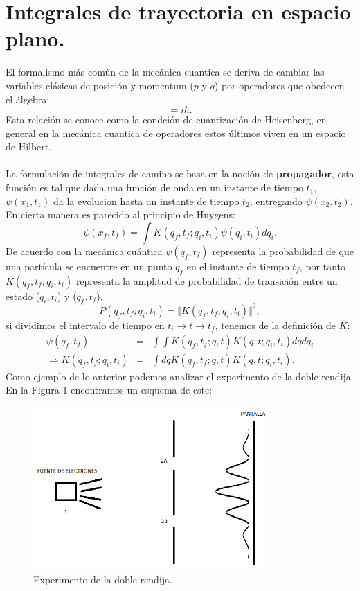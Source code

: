 \chapter{Integrales de trayectoria	 en espacio plano.}
El formalismo más común de la mecánica cuantica se deriva de cambiar las variables clásicas de posición y momentum ($p$ y $q$) por operadores que obedecen el álgebra:
\begin{equation}
[\hat{q},\hat{p}]=i\hbar.
\end{equation}
Esta relación se conoce como la condción de cuantización de Heisenberg, en general en la mecánica cuantica de operadores estos últimos viven en un espacio de Hilbert.
\\
\\
La formulación de integrales de camino se basa en la noción de \textbf{propagador}, esta función es tal que dada una función de onda en un instante de tiempo $t_1$, $\psi(x_1,t_1)$ da la evolucion hasta un instante de tiempo $t_2$, entregando $\psi(x_2,t_2)$. En cierta manera es parecido al principio de Huygens:
\begin{equation}
\psi(x_f,t_f)=\int K(q_f,t_f;q_i,t_i)\psi(q_i,t_i)dq_i.
\end{equation}
De acuerdo con la mecánica cuántica $\psi(q_f,t_f)$ representa la probabilidad de que una partícula se encuentre en un punto $q_f$ en el instante de tiempo $t_f$, por tanto $K(q_f,t_f;q_i,t_i)$ representa la amplitud de probabilidad de transición entre un estado ($q_i,t_i$) y ($q_f,t_f$).
\begin{equation}
P(q_f,t_f;q_i,t_i)=\Vert K(q_f,t_f;q_i,t_i) \Vert^2,
\end{equation}
si dividimos el intervalo de tiempo en $t_i\rightarrow t \rightarrow t_f$, tenemos de la definición de $K$:
\begin{eqnarray}
\nonumber \psi(q_f,t_f)&=&\int\int K(q_f,t_f;q,t)K(q,t;q_i,t_i)dqdq_i\\
\Rightarrow K(q_f,t_f;q_i,t_i)&=&\int dq K(q_f,t_f;q,t)K(q,t;q_i,t_i).
\end{eqnarray}
Como ejemplo de lo anterior podemos analizar el experimento de la doble rendija. En la Figura 1 encontramos un esquema de este:
\begin{figure}[h]
\centering
\includegraphics[width=9cm]{Imagenes/Fig1}
\caption[Esquema del experimento de la doble rendija]{Experimento de la doble rendija.}
\end{figure}
